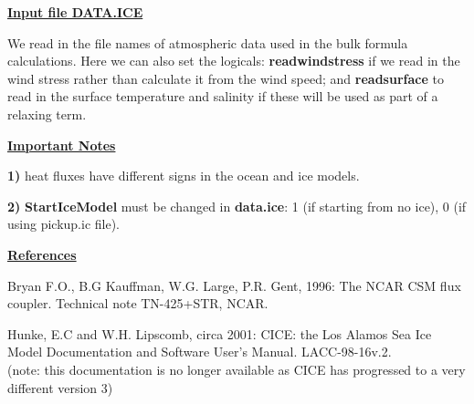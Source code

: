 \noindent
{\bf {\underline{Input file DATA.ICE}}}

\noindent
We read in the file names of atmospheric data used in
the  bulk formula calculations. Here we can also set
the logicals: {\bf readwindstress} if we read in the
wind stress rather than calculate it from the wind
speed; and {\bf readsurface} to read in the surface
temperature and salinity if these will be used as
part of a relaxing term.

\vspace{1cm}

\noindent
{\bf {\underline{Important Notes}}}

\noindent
{\bf 1)} heat fluxes have different signs in the ocean and ice
models.

\noindent
{\bf 2)} {\bf StartIceModel} must be changed in {\bf data.ice}:
1 (if starting from no ice), 0 (if using pickup.ic file).


\vspace{1cm}

\noindent 
{\bf {\underline{References}}}


\vspace{.2cm}

\noindent
Bryan F.O., B.G Kauffman, W.G. Large, P.R. Gent, 1996:
The NCAR CSM flux coupler. Technical note TN-425+STR,
NCAR.

\vspace{.2cm}

\noindent
Hunke, E.C and W.H. Lipscomb, circa 2001: CICE: the Los Alamos
Sea Ice Model Documentation and Software User's Manual.
LACC-98-16v.2.\\
(note: this documentation is no longer available as CICE has progressed
to a very different version 3)





% 
